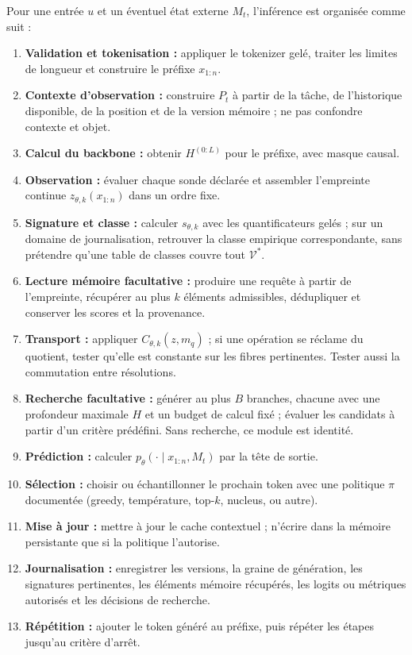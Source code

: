 \documentclass[11pt,a4paper]{article}
\theoremstyle{remark}
\newcommand{\V}{\mathcal V}
\begin{document}
Pour une entrée $u$ et un éventuel état externe $M_t$, l'inférence est organisée comme suit :
\begin{enumerate}[label=\textbf{I\arabic*.}]
  \item \textbf{Validation et tokenisation :} appliquer le tokenizer gelé, traiter les limites de longueur et construire le préfixe $x_{1:n}$.
  \item \textbf{Contexte d'observation :} construire $P_t$ à partir de la tâche, de l'historique disponible, de la position et de la version mémoire ; ne pas confondre contexte et objet.
  \item \textbf{Calcul du backbone :} obtenir $H^{(0:L)}$ pour le préfixe, avec masque causal.
  \item \textbf{Observation :} évaluer chaque sonde déclarée et assembler l'empreinte continue $z_{\theta,k}(x_{1:n})$ dans un ordre fixe.
  \item \textbf{Signature et classe :} calculer $s_{\theta,k}$ avec les quantificateurs gelés ; sur un domaine de journalisation, retrouver la classe empirique correspondante, sans prétendre qu'une table de classes couvre tout $\V^*$.
  \item \textbf{Lecture mémoire facultative :} produire une requête à partir de l'empreinte, récupérer au plus $k$ éléments admissibles, dédupliquer et conserver les scores et la provenance.
  \item \textbf{Transport :} appliquer $C_{\theta,k}(z,m_q)$ ; si une opération se réclame du quotient, tester qu'elle est constante sur les fibres pertinentes. Tester aussi la commutation entre résolutions.
  \item \textbf{Recherche facultative :} générer au plus $B$ branches, chacune avec une profondeur maximale $H$ et un budget de calcul fixé ; évaluer les candidats à partir d'un critère prédéfini. Sans recherche, ce module est identité.
  \item \textbf{Prédiction :} calculer $p_\theta(\cdot\mid x_{1:n},M_t)$ par la tête de sortie.
  \item \textbf{Sélection :} choisir ou échantillonner le prochain token avec une politique $\pi$ documentée (greedy, température, top-$k$, nucleus, ou autre).
  \item \textbf{Mise à jour :} mettre à jour le cache contextuel ; n'écrire dans la mémoire persistante que si la politique l'autorise.
  \item \textbf{Journalisation :} enregistrer les versions, la graine de génération, les signatures pertinentes, les éléments mémoire récupérés, les logits ou métriques autorisés et les décisions de recherche.
  \item \textbf{Répétition :} ajouter le token généré au préfixe, puis répéter les étapes jusqu'au critère d'arrêt.
\end{enumerate}
\end{document}
